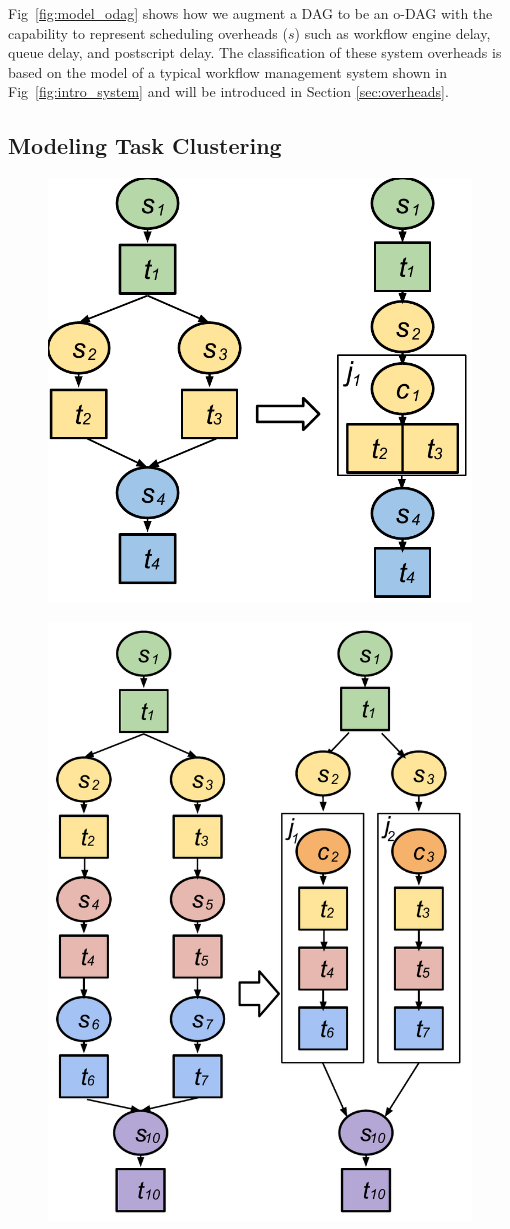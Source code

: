 Fig~\ref{fig:model_odag} shows how we augment a DAG to be an o-DAG with the capability to represent scheduling overheads ($s$) such as workflow engine delay, queue delay, and postscript delay. The classification of these system overheads is based on the model of a typical workflow management system shown in Fig~\ref{fig:intro_system} and will be introduced in Section \ref{sec:overheads}. 


\subsection{Modeling Task Clustering}
\label{sec:task_clustering}

\begin{figure}[h!]
\centering
 \includegraphics[width=0.5\linewidth]{figures/introduction/hc.pdf}
  \label{fig:intro_hc}
\end{figure}


\begin{figure}[!htb]
\centering
 \includegraphics[width=0.5\linewidth]{figures/model/vc.pdf}
  \label{fig:model_vc}
\end{figure}


